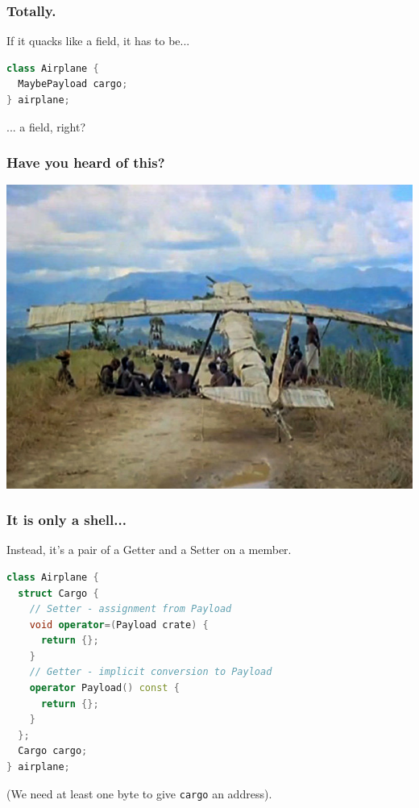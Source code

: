 \documentclass{beamer}
\def\code#1{\texttt{#1}}
\begin{document}
\begin{frame}[fragile]
\frametitle{Totally.}

\begin{center}
If it quacks like a field, it has to be...
\end{center}

\begin{lstlisting}[language=cpp]
class Airplane {
  MaybePayload cargo;
} airplane;
\end{lstlisting}

\begin{center}
... a field, right?
\end{center}
\end{frame}


\begin{frame}[fragile]
\frametitle{Have you heard of this?}

\includegraphics[width=\textwidth]{CargoCultAirplane.jpg}
\end{frame}


\begin{frame}[fragile]
\frametitle{It is only a shell...}

\begin{center}
Instead, it's a pair of a Getter and a Setter on a member.
\end{center}
\begin{lstlisting}[language=cpp]
class Airplane {
  struct Cargo {
    // Setter - assignment from Payload
    void operator=(Payload crate) {
      return {};
    }
    // Getter - implicit conversion to Payload
    operator Payload() const {
      return {};
    }
  };
  Cargo cargo;
} airplane;
\end{lstlisting}
\begin{center}
{\small(We need at least one byte to give \code{cargo} an address)}.
\end{center}
\end{frame}
\end{document}
